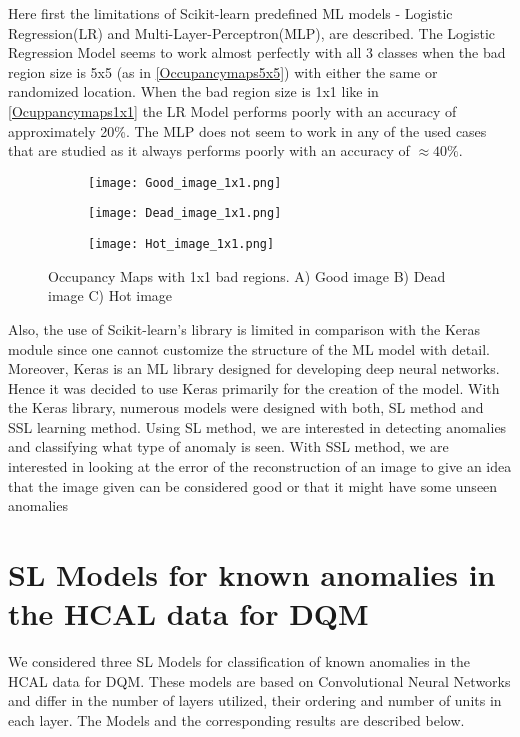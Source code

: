 Here first the limitations of Scikit-learn predefined ML models - Logistic Regression(LR) and Multi-Layer-Perceptron(MLP), are described. The Logistic Regression Model seems to work almost perfectly with all 3 classes when the bad region size is 5x5 (as in \autoref{Occupancymaps5x5}) with either the same or randomized location. When the bad region size is 1x1 like in \autoref{Ocuppancymaps1x1} the LR Model performs poorly with an accuracy of approximately 20\%.
 The MLP does not seem to work in any of the used cases that are studied as it always performs poorly with an accuracy of $\approx 40\%$.

\begin{figure}[h]
\centering
\begin{subfigure}[t]{.316\textwidth}
\texttt{[image: Good\_image\_1x1.png]}
\caption{}
\end{subfigure}
\begin{subfigure}[t]{.305\textwidth}
\texttt{[image: Dead\_image\_1x1.png]}
\caption{}
\end{subfigure}
\begin{subfigure}[t]{.3\textwidth}
\texttt{[image: Hot\_image\_1x1.png]}
\caption{}
\end{subfigure}
\vspace{5mm}
\caption{Occupancy Maps with 1x1 bad regions. A) Good image B) Dead image C) Hot image\label{Ocuppancymaps1x1}}
\end{figure}

Also, the use of Scikit-learn’s library is limited in comparison with the Keras module since one cannot customize the structure of the ML model with detail. Moreover, Keras is an ML library designed for developing deep neural networks. Hence it was decided to use Keras primarily for the creation of the model.
 With the Keras library, numerous models were designed with both, SL method and SSL learning method. Using SL method, we are interested in detecting anomalies and classifying what type of anomaly is seen. With SSL method, we are interested in looking at the error of the reconstruction of an image to give an idea that the image given can be considered good or that it might have some unseen anomalies

\section{SL Models for known anomalies in the HCAL data for DQM}
We considered three SL Models for classification of known anomalies in the HCAL data for DQM. 
These models are based on Convolutional Neural Networks and differ in the number of layers utilized, their ordering and number of units in each layer. The Models and the corresponding results are described below.


